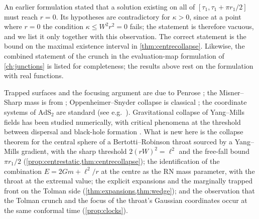 
\begin{remark}
An earlier formulation stated that a solution existing on all of $[\tau_1,\tau_1+\pi r_1/2]$ must reach $r=0$. Its hypotheses are contradictory for $\kappa>0$, since at a point where $r=0$ the condition $\kappa\le W^2r^2=0$ fails; the statement is therefore vacuous, and we list it only together with this observation. The correct statement is the bound on the maximal existence interval in \cref{thm:centrecollapse}. Likewise, the combined statement of the crunch in the evaluation-map formulation of \cref{ch:junctions} is listed for completeness; the results above rest on the formulation with real functions.
\end{remark}

\begin{litbox}
Trapped surfaces and the focusing argument are due to Penrose \cite{Penrose1965}; the Misner--Sharp mass is from \cite{MisnerSharp1964}; Oppenheimer--Snyder collapse is classical \cite{OppenheimerSnyder1939}; the coordinate systems of $\mathrm{AdS}_2$ are standard (see e.g.\ \cite{Spradlin1999}). Gravitational collapse of Yang--Mills fields has been studied numerically, with critical phenomena at the threshold between dispersal and black-hole formation \cite{ChoptuikChmajBizon1996}. What is new here is the collapse theorem for the central sphere of a Bertotti--Robinson throat sourced by a Yang--Mills gradient, with the sharp threshold $2(rW)^2=\ell^2$ and the free-fall bound $\pi r_1/2$ (\cref{prop:centrestatic,thm:centrecollapse}); the identification of the combination $E=2Gm+\ell^2/r$ at the centre as the RN mass parameter, with the throat at the extremal value; the explicit expansions and the marginally trapped front on the Tolman side (\cref{thm:expansions,thm:wedge}); and the observation that the Tolman crunch and the focus of the throat's Gaussian coordinates occur at the same conformal time (\cref{prop:clocks}).
\end{litbox}

